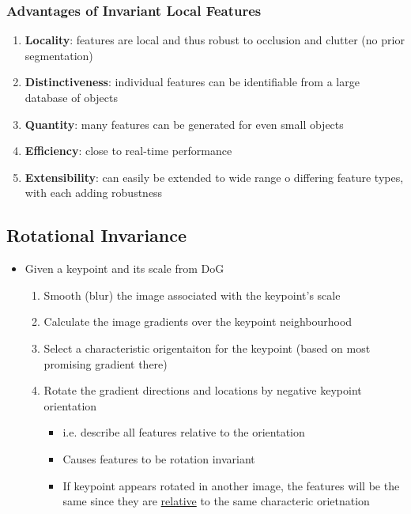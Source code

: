 \documentclass[letterpaper,12pt]{article}
\begin{document}
\subsubsection{Advantages of Invariant Local Features}
\begin{enumerate}
 \item \textbf{Locality}: features are local and thus robust to occlusion and clutter (no prior segmentation)
 \item \textbf{Distinctiveness}: individual features can be identifiable from a large database of objects
 \item \textbf{Quantity}: many features can be generated for even small objects
 \item \textbf{Efficiency}: close to real-time performance
 \item \textbf{Extensibility}: can easily be extended to wide range o differing feature types, with each adding robustness
\end{enumerate}

\subsection{Rotational Invariance}
\begin{itemize}
 \item Given a keypoint and its scale from DoG
       \begin{enumerate}
        \item Smooth (blur) the image associated with the keypoint's scale
        \item Calculate the image gradients over the keypoint neighbourhood
        \item Select a characteristic origentaiton for the keypoint (based on most promising gradient there)
        \item Rotate the gradient directions and locations by negative keypoint orientation
              \begin{itemize}
               \item i.e. describe all features relative to the orientation
               \item Causes features to be rotation invariant
               \item If keypoint appears rotated in another image, the features will be the same since they are \underline{relative} to the same characteric orietnation
              \end{itemize}
       \end{enumerate}
\end{itemize}
\end{document}

